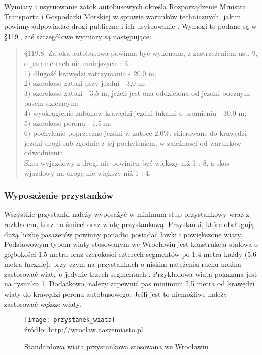 \documentclass[twoside,12pt]{article}
\begin{document}
	Wymiary i usytuowanie zatok autobusowych określa Rozporządzenie Ministra Transportu i Gospodarki Morskiej w sprawie warunków technicznych, jakim powinny odpowiadać drogi publiczne i ich usytuowanie \cite{rozporzadzenie_drogi}. Wymogi te podane są w §119., zaś szczegółowe wymiary są następujące:
	\begin{quote}
	§119.8. Zatoka autobusowa powinna być wykonana, z zastrzeżeniem ust. 9, o parametrach nie mniejszych niż: \\
1)	długość krawędzi zatrzymania - 20,0 m; \\
2)	szerokość zatoki przy jezdni - 3,0 m; \\
3)	szerokość zatoki - 3,5 m, jeżeli jest ona oddzielona od jezdni bocznym pasem dzielącym; \\
4)	wyokrąglenie załomów krawędzi jezdni łukami o promieniu - 30,0 m; \\
5)	szerokość peronu - 1,5 m; \\
6)	pochylenie poprzeczne jezdni w zatoce 2,0\%, skierowane do krawędzi jezdni drogi lub zgodnie z jej pochyleniem, w zależności od warunków odwodnienia. \\
Skos wyjazdowy z drogi nie powinien być większy niż 1 : 8, a skos wjazdowy na drogę nie większy niż 1 : 4. \\
	\end{quote}%
	
	\subsubsection{Wyposażenie przystanków}
	
	Wszystkie przystanki należy wyposażyć w minimum słup przystankowy wraz z rozkładem, kosz na śmieci oraz wiatę przystankową. Przystanki, które obsługują dużą liczbę pasażerów powinny ponadto posiadać ławki i powiększone wiaty. Podstawowym typem wiaty stosowanym we Wrocławiu jest konstrukcja stalowa o głębokości 1,5 metra oraz szerokości czterech segmentów po 1,4 metra każdy (5,6 metra łącznie), przy czym na przystankach o niskim natężeniu ruchu można zastosować wiatę o jedynie trzech segmentach \cite{standardy_wroclaw}. Przykładowa wiata pokazana jest na rysunku \ref{przystanek_wiata}. Dodatkowo, należy zapewnić pas minimum 2,5 metra od krawędzi wiaty do krawędzi peronu autobusowego. Jeśli jest to niemożliwe należy zastosować węższe wiaty. 
	
		\begin{figure}[H]
		\centering
		\caption{Standardowa wiata przystankowa stosowana we Wrocławiu}
		\texttt{[image: przystanek\_wiata]}\\
		\footnotesize{źródło: \url{http://wroclaw.naszemiasto.pl}}
		\label{przystanek_wiata}
	\end{figure}
	
\end{document}
